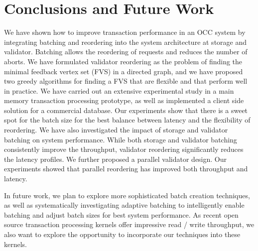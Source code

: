 \section{Conclusions and Future Work}\label{sec:conclusion}
We have shown how to improve transaction performance in an OCC system by integrating batching and reordering into the system architecture at storage and validator. Batching allows the reordering of requests and reduces the number of aborts. We have formulated validator reordering as the problem of finding the minimal feedback vertex set (FVS) in a directed graph, and we have proposed two greedy algorithms for finding a FVS that are flexible and that perform well in practice. We have carried out an extensive experimental study in a main memory transaction processing prototype, as well as implemented a client side solution for a commercial database. Our experiments show that there is a sweet spot for the batch size for the best balance between latency and the flexibility of reordering. We have also investigated the impact of storage and validator batching on system performance. While both storage and validator batching consistently improve the throughput, validator reordering significantly reduces the latency profiles. We further proposed a parallel validator design. Our experiments showed that parallel reordering has improved both throughput and latency.

In future work, we plan to explore more sophisticated batch creation techniques, as well as systematically investigating adaptive batching to intelligently enable batching and adjust batch sizes for best system performance. As recent open source transaction processing kernels offer impressive
read / write throughput, we also want to explore the opportunity to incorporate our techniques into these kernels.
